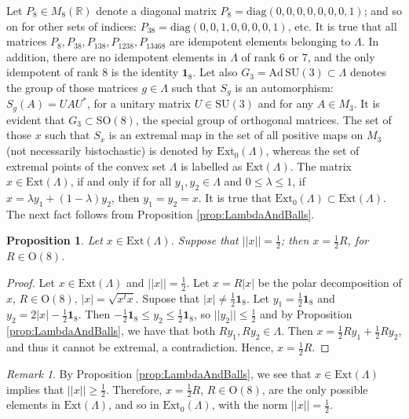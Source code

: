 \documentclass[12pt]{article}
\theoremstyle{plain}
\newtheorem{proposition}{Proposition}
\theoremstyle{definition}
\theoremstyle{remark}
\newtheorem{remark}{Remark}
\numberwithin{equation}{section}
\begin{document}
Let $P_{8} \in M_{8}(\mathbb{R})$ denote a diagonal matrix
$P_{8} = \text{diag}(0,0,0,0,0,0,0,1)$;
and so on for other sets of indices:
$P_{38} = \text{diag}(0,0,1,0,0,0,0,1)$, etc.
It is true that all matrices
$P_{8}, P_{38}, P_{138}, P_{1238}, P_{13468}$ are idempotent elements 
belonging to $\Lambda$.
In addition, there are no idempotent elements in $\Lambda$ of rank 6 or 7,
and the only idempotent of rank 8 is the identity $\mathbf{1}_{8}$.
Let also $G_{3} = \text{Ad} \, \text{SU}(3) \subset \Lambda$ denotes
the group of those matrices $g \in \Lambda$ such that
$S_{g}$ is an automorphism: $S_{g}(A) = U A U^{*}$,
for a unitary matrix $U \in \text{SU}(3)$ and for any $A \in M_{3}$.
It is evident that $G_{3} \subset \text{SO}(8)$,
the special group of orthogonal matrices.
The set of those $x$ such that $S_{x}$ is an extremal map in the set
of all positive maps on $M_{3}$ (not necessarily bistochastic) is denoted by
$\text{Ext}_{0}(\Lambda)$,
whereas the set of extremal points of the convex set $\Lambda$ is labelled as
$\text{Ext}(\Lambda)$.
The matrix $x \in \text{Ext}(\Lambda)$,
if and only if for all 
$y_{1}, y_{2} \in \Lambda$ and $0 \leq \lambda \leq 1$,
if $x = \lambda y_{1} + (1-\lambda) y_{2}$,
then $y_{1} = y_{2} = x$.
It is true that $\text{Ext}_{0}(\Lambda) \subset \text{Ext}(\Lambda)$.
The next fact follows from Proposition \ref{prop:LambdaAndBalls}.

\begin{proposition}
    \label{prop:oneHalfofOrthogonal}
    Let $x \in \mathrm{Ext}(\Lambda)$.
    Suppose that $||x|| = \frac{1}{2}$;
    then $ x = \frac{1}{2} R$,  for $R \in \mathrm{O}(8)$.
\end{proposition}
\begin{proof}
    Let $x \in \mathrm{Ext}(\Lambda)$ and $||x|| = \frac{1}{2}$.
    Let $x = R |x|$ be the polar decomposition of $x$,
    $R \in \text{O}(8)$, $|x| = \sqrt{x^{t} x}$.
    Supose that $|x| \neq \frac{1}{2} \mathbf{1}_{8}$.
    Let $y_{1} = \frac{1}{2} \mathbf{1}_{8}$ and
    $y_{2} = 2 |x| - \frac{1}{2} \mathbf{1}_{8}$.
    Then $- \frac{1}{2} \mathbf{1}_{8} \leq y_{2} \leq \frac{1}{2} \mathbf{1}_{8}$,
    so $|| y_{2} || \leq \frac{1}{2}$
    and by Proposition \ref{prop:LambdaAndBalls},
    we have that both $R y_{1}, R y_{2} \in \Lambda$.
    Then $x = \frac{1}{2} R y_{1} + \frac{1}{2} R y_{2}$,
    and thus it cannot be extremal, a contradiction.
    Hence, $x = \frac{1}{2} R$.
\end{proof}


\begin{remark}
    By Proposition \ref{prop:LambdaAndBalls},
    we see that $x \in \text{Ext}(\Lambda)$ implies that
    $||x|| \geq \frac{1}{2}$.
    Therefore, $x = \frac{1}{2} R$, $R \in \mathrm{O}(8)$,
    are the only possible elements in $\text{Ext}(\Lambda)$,
    and so in $\text{Ext}_{0}(\Lambda)$,
    with the norm $||x|| = \frac{1}{2}$.
\end{remark}
\end{document}
